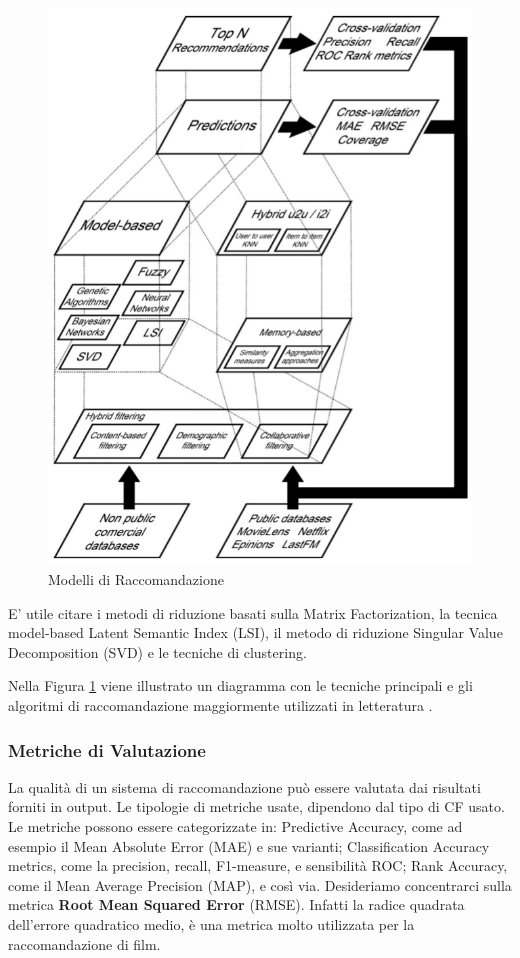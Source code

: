 \documentclass[11pt]{article}
\begin{document}
\begin{figure}[H]
	\centering
	\includegraphics[scale=0.40]{images/model-recomm.png}
	\caption{Modelli di Raccomandazione \cite{Bobadilla:2013:RSS:2483330.2483573}}
	\label{model-rec}
\end{figure}

E' utile citare i metodi di riduzione basati sulla Matrix Factorization, la tecnica model-based Latent Semantic Index (LSI), il metodo di riduzione Singular Value Decomposition
(SVD) e le tecniche di clustering.

Nella Figura \ref{model-rec} viene illustrato un diagramma con le tecniche principali e gli algoritmi di raccomandazione maggiormente utilizzati in letteratura \cite{Bobadilla:2013:RSS:2483330.2483573}.

\subsubsection{Metriche di Valutazione}
La qualità di un sistema di raccomandazione può essere valutata dai risultati forniti in output. Le tipologie di metriche usate, dipendono dal tipo di CF usato. Le metriche possono essere categorizzate in:
Predictive Accuracy, come ad esempio il Mean Absolute Error
(MAE) e sue varianti; Classification Accuracy metrics, come la precision, recall, F1-measure, e sensibilità ROC; Rank Accuracy, come il Mean Average Precision (MAP), e così via.
Desideriamo concentrarci sulla metrica \textbf{Root Mean Squared Error} (RMSE). Infatti la radice quadrata dell'errore quadratico medio, è una metrica molto utilizzata per la raccomandazione di film.
\end{document}
